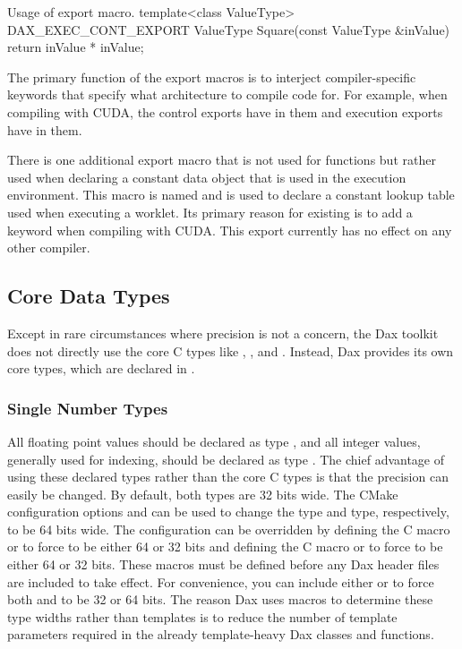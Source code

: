 \begin{daxexample}{Usage of export macro.}
template<class ValueType>
DAX_EXEC_CONT_EXPORT
ValueType Square(const ValueType &inValue)
{
 return inValue * inValue;
}
\end{daxexample}

The primary function of the export macros is to interject compiler-specific
keywords that specify what architecture to compile code for. For example,
when compiling with CUDA, the control exports have
 in them and execution exports have
 in them.

There is one additional export macro that is not used for functions but
rather used when declaring a constant data object that is used in the
execution environment. This macro is named
and is used to declare a constant lookup table used when executing a
worklet. Its primary reason for existing is to add a
 keyword when compiling with CUDA. This export
currently has no effect on any other compiler.

\subsection{Core Data Types}
\label{sec:CoreDataTypes}

Except in rare circumstances where precision is not a concern, the Dax
toolkit does not directly use the core C types like ,
, and . Instead, Dax provides its own core
types, which are declared in .

\subsubsection{Single Number Types}

All floating point values should be declared as type , and all
integer values, generally used for indexing, should be declared as type
. The chief advantage of using these declared types rather than the
core C types is that the precision can easily be changed. By default, both
types are 32 bits wide. The CMake configuration options
 and 
can be used to change the  type and  type,
respectively, to be 64 bits wide. The configuration can be overridden by
defining the C macro  or
 to force  to be either 64
or 32 bits and defining the C macro  or
 to force  to be either 64 or 32
bits. These macros must be defined before any Dax header files are included
to take effect. For convenience, you can include either
 or
 to force both  and
 to be 32 or 64 bits. The reason Dax uses macros to determine these
type widths rather than templates is to reduce the number of template
parameters required in the already template-heavy Dax classes and
functions.

